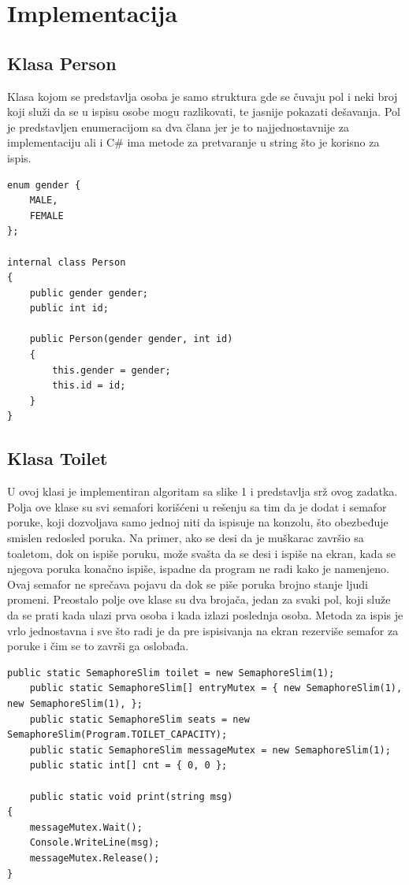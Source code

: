 \documentclass[11pt]{article}
\begin{document}
	\section{Implementacija}
	\subsection{Klasa Person}
	Klasa kojom se predstavlja osoba je samo struktura gde se čuvaju pol
	i neki broj koji služi da se u ispisu osobe mogu razlikovati, te jasnije
	pokazati dešavanja.
	Pol je predstavljen enumeracijom sa dva člana jer je to najjednostavnije za
	implementaciju ali i C\# ima metode za pretvaranje u string što je korisno
	za ispis.
	\begin{lstlisting}[language={[Sharp]C}]
enum gender {
	MALE,
	FEMALE
};

internal class Person
{
    public gender gender;
    public int id;

    public Person(gender gender, int id)
    {
        this.gender = gender;
        this.id = id;
    }
}
	\end{lstlisting}
	\subsection{Klasa Toilet}
	U ovoj klasi je implementiran algoritam sa slike 1 i predstavlja srž ovog
	zadatka.
	Polja ove klase su svi semafori korišćeni u rešenju sa tim da je dodat i
	semafor poruke, koji dozvoljava samo jednoj niti da ispisuje na konzolu,
	što obezbeđuje smislen redosled poruka.
	Na primer, ako se desi da je muškarac završio sa toaletom, dok on ispiše
	poruku, može svašta da se desi i ispiše na ekran, kada se njegova poruka
	konačno ispiše, ispadne da program ne radi kako je namenjeno.
	Ovaj semafor ne sprečava pojavu da dok se piše poruka brojno stanje ljudi
	promeni.
	Preostalo polje ove klase su dva brojača, jedan za svaki pol, koji služe
	da se prati kada ulazi prva osoba i kada izlazi poslednja osoba.
	Metoda za ispis je vrlo jednostavna i sve što radi je da pre ispisivanja na
	ekran rezerviše semafor za poruke i čim se to završi ga oslobađa.
	\begin{lstlisting}[language={[Sharp]C}]
	public static SemaphoreSlim toilet = new SemaphoreSlim(1);
	public static SemaphoreSlim[] entryMutex = { new SemaphoreSlim(1), new SemaphoreSlim(1), };
	public static SemaphoreSlim seats = new SemaphoreSlim(Program.TOILET_CAPACITY);
	public static SemaphoreSlim messageMutex = new SemaphoreSlim(1);
	public static int[] cnt = { 0, 0 };

	public static void print(string msg)
{
    messageMutex.Wait();
    Console.WriteLine(msg);
    messageMutex.Release();
}
	\end{lstlisting}
\end{document}

